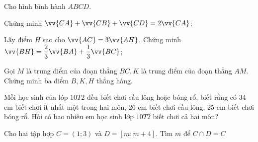 \documentclass[12pt,twoside]{book}
\def\overrightarrow{\vv}
\theoremstyle{definition}
\theoremstyle{nonumberplain}
\def\overrightarrow{\vv}
\begin{document}
\begin{ex}
Cho hình bình hành ${ABCD}$.
\begin{listEX}
\item Chứng minh $\overrightarrow{CA}+\overrightarrow{CB}+\overrightarrow{CD}=2 \overrightarrow{CA}$;
\item Lấy điểm ${H}$ sao cho $\overrightarrow{AC}=3 \overrightarrow{A H}$. Chứng minh $\overrightarrow{BH}=\dfrac{2}{3} \overrightarrow{BA}+\dfrac{1}{3} \overrightarrow{BC}$;
\item Gọi ${M}$ là trung điểm của đoạn thẳng ${BC}, {K}$ là trung điểm của đoạn thẳng ${AM}$. Chứng minh ba điểm ${B}, {K}, {H}$ thẳng hàng.
\end{listEX}
\end{ex}


\begin{ex}
Mỗi học sinh của lóp $10T2$ đều biết chơi cầu lông hoặc bóng rổ, biết rằng có 34 em biết chơi ít nhất một trong hai môn, 26 em biết chơi cầu lông, 25 em biết chơi bóng rổ. Hỏi có bao nhiêu em học sinh lớp $10T2$ biết chơi cả hai môn?
\end{ex}

\begin{ex}
Cho hai tập hợp $C=(1 ; 3)$ và $D=[m ; m+4]$. Tìm $m$ để $C \cap D=C$
\end{ex} 
\end{document}
